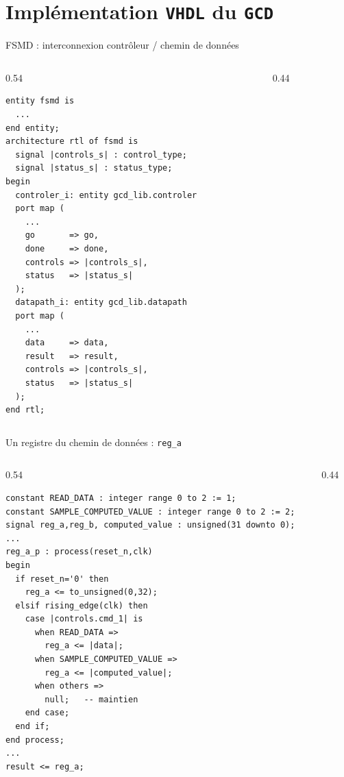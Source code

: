 \section{Implémentation \texttt{VHDL} du \texttt{GCD}}
\begin{frame}[fragile,t]{FSMD : interconnexion contrôleur / chemin de données}
\begin{columns}[T]
\begin{column}{0.54\textwidth}
\begin{lstlisting}
entity fsmd is
  ...
end entity;
architecture rtl of fsmd is
  signal |controls_s| : control_type;
  signal |status_s| : status_type;
begin
  controler_i: entity gcd_lib.controler
  port map (
    ...
    go       => go,
    done     => done,
    controls => |controls_s|,
    status   => |status_s|
  );
  datapath_i: entity gcd_lib.datapath
  port map (
    ...
    data     => data,
    result   => result,
    controls => |controls_s|,
    status   => |status_s|
  );
end rtl;
\end{lstlisting}
\end{column}
\begin{column}{0.44\textwidth}
\end{column}
\end{columns}
\end{frame}

\begin{frame}[fragile,t]{Un registre du chemin de données : \texttt{reg\_a}}
\begin{columns}[T]
\begin{column}{0.54\textwidth}
\begin{lstlisting}
constant READ_DATA : integer range 0 to 2 := 1;
constant SAMPLE_COMPUTED_VALUE : integer range 0 to 2 := 2;
signal reg_a,reg_b, computed_value : unsigned(31 downto 0);
...
reg_a_p : process(reset_n,clk)
begin
  if reset_n='0' then
    reg_a <= to_unsigned(0,32);
  elsif rising_edge(clk) then
    case |controls.cmd_1| is
      when READ_DATA =>
        reg_a <= |data|;
      when SAMPLE_COMPUTED_VALUE =>
        reg_a <= |computed_value|;
      when others =>
        null;   -- maintien
    end case;
  end if;
end process;
...
result <= reg_a;
\end{lstlisting}
\end{column}
\begin{column}{0.44\textwidth}
\end{column}
\end{columns}
\end{frame}

